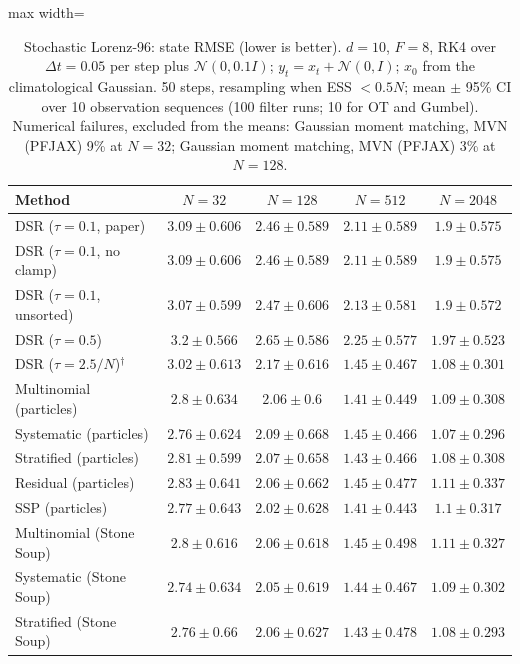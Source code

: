 \begin{table}[H]
\centering
\small
\caption{Stochastic Lorenz-96: state RMSE (lower is better). $d{=}10$, $F{=}8$, RK4 over $\Delta t{=}0.05$ per step plus $\mathcal N(0,0.1I)$; $y_t=x_t+\mathcal N(0,I)$; $x_0$ from the climatological Gaussian. 50 steps, resampling when ESS $<0.5N$; mean $\pm$ 95\% CI over 10 observation sequences (100 filter runs; 10 for OT and Gumbel). Numerical failures, excluded from the means: Gaussian moment matching, MVN (PFJAX) 9\% at $N{=}32$; Gaussian moment matching, MVN (PFJAX) 3\% at $N{=}128$.}
\label{tab:lorenz96-rmse}
\begin{adjustbox}{max width=\linewidth}
\begin{tabular}{lcccc}
\toprule
Method & $N{=}32$ & $N{=}128$ & $N{=}512$ & $N{=}2048$ \\
\midrule
DSR ($\tau{=}0.1$, paper) & $3.09\pm0.606$ & $2.46\pm0.589$ & $2.11\pm0.589$ & $1.9\pm0.575$ \\
DSR ($\tau{=}0.1$, no clamp) & $3.09\pm0.606$ & $2.46\pm0.589$ & $2.11\pm0.589$ & $1.9\pm0.575$ \\
DSR ($\tau{=}0.1$, unsorted) & $3.07\pm0.599$ & $2.47\pm0.606$ & $2.13\pm0.581$ & $1.9\pm0.572$ \\
DSR ($\tau{=}0.5$) & $3.2\pm0.566$ & $2.65\pm0.586$ & $2.25\pm0.577$ & $1.97\pm0.523$ \\
DSR ($\tau{=}2.5/N$)$^\dagger$ & $3.02\pm0.613$ & $2.17\pm0.616$ & $1.45\pm0.467$ & $1.08\pm0.301$ \\
\midrule
Multinomial (particles) & $2.8\pm0.634$ & $2.06\pm0.6$ & $1.41\pm0.449$ & $1.09\pm0.308$ \\
Systematic (particles) & $2.76\pm0.624$ & $2.09\pm0.668$ & $1.45\pm0.466$ & $1.07\pm0.296$ \\
Stratified (particles) & $2.81\pm0.599$ & $2.07\pm0.658$ & $1.43\pm0.466$ & $1.08\pm0.308$ \\
Residual (particles) & $2.83\pm0.641$ & $2.06\pm0.662$ & $1.45\pm0.477$ & $1.11\pm0.337$ \\
SSP (particles) & $2.77\pm0.643$ & $2.02\pm0.628$ & $1.41\pm0.443$ & $1.1\pm0.317$ \\
Multinomial (Stone Soup) & $2.8\pm0.616$ & $2.06\pm0.618$ & $1.45\pm0.498$ & $1.11\pm0.327$ \\
Systematic (Stone Soup) & $2.74\pm0.634$ & $2.05\pm0.619$ & $1.44\pm0.467$ & $1.09\pm0.302$ \\
Stratified (Stone Soup) & $2.76\pm0.66$ & $2.06\pm0.627$ & $1.43\pm0.478$ & $1.08\pm0.293$ \\

\end{tabular}
\end{adjustbox}
\end{table}
